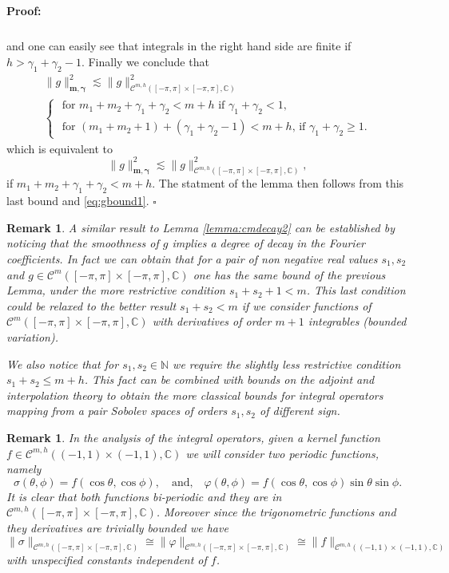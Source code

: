 \documentclass{article}
\newtheorem{remark}[theorem]{Remark}
\newenvironment{proof}{\paragraph{Proof:}}{\hfill$\square$}
\newcommand{\IC}{{\mathbb C}}
\newcommand{\IN}{{\mathbb N}}
\newcommand{\cmspace}[3]{\mathcal{C}^{#1} \left( #2, #3 \right)}
\newcommand{\cmspaceh}[4]{\mathcal{C}^{#1,#2} \left( #3, #4 \right)}
\newcommand{\iinterv}{(-1,1)\times(-1,1)}
\begin{document}
\begin{proof}
\begin{align*}
\end{align*}
and one can easily see that integrals in the right hand side are finite if $h > \gamma_1 + \gamma_2 -1$. 
Finally we conclude that 
\begin{align*}
\|g\|_{\mathbf{m},\mathbf{\gamma}}^2 \lesssim \|g\|^2_{\cmspaceh{m}{h}{[-\pi,\pi]\times[-\pi,\pi]}{\IC}}\\\begin{cases}
 \text{  for $m_1+m_2+\gamma_1 + \gamma_2 < m+h$ if $\gamma_1 + \gamma_2 < 1$},\\
 \text{ for $(m_1+m_2+1)+(\gamma_1+\gamma_2 -1)< m+h$, if $\gamma_1 + \gamma_2 \geq 1$}.
\end{cases}
\end{align*}
which is equivalent to 
$$
\|g\|_{\mathbf{m},\mathbf{\gamma}}^2 \lesssim \|g\|^2_{\cmspaceh{m}{h}{[-\pi,\pi]\times[-\pi,\pi]}{\IC}},
$$
if $m_1+m_2+\gamma_1+\gamma_2 < m+h$. 
The statment of the lemma then follows from this last bound and \eqref{eq:gbound1}.
\end{proof}

\begin{remark}
A similar result to Lemma \ref{lemma:cmdecay2} can be established by noticing that the smoothness of $g$ implies a degree of decay in the Fourier coefficients. In fact we can obtain that for a pair of non negative real values $s_1,s_2$ and $g \in \cmspace{m}{[-\pi,\pi]\times[-\pi,\pi]}{\IC}$ one has the same bound of the previous Lemma, under the more restrictive condition $s_1+s_2+1 < m$.
This last condition could be relaxed to the better result $s_1+s_2 < m$ if we consider functions of $\cmspace{m}{[-\pi,\pi]\times[-\pi,\pi]}{\IC}$ with derivatives of order $m+1$ integrables (bounded variation).

We also notice that for $s_1, s_2 \in \IN$ we require the slightly less restrictive condition $s_1+s_2 \leq m+h$. This fact can be combined with bounds on the adjoint and interpolation theory to obtain the more classical bounds for integral operators mapping from a pair Sobolev spaces of orders $s_1,s_2$ of different sign.
\end{remark}

\begin{remark}
\label{rem:sigmaphi}
In the analysis of the integral operators, given a kernel function $f \in \cmspaceh{m}{h}{\iinterv}{\IC}$ we will consider two periodic functions, namely 
$$
\sigma(\theta,\phi ) = f(\cos \theta, \cos \phi), \quad \text{and,} \quad \varphi(\theta,\phi) = f(\cos \theta, \cos \phi)\sin \theta \sin \phi.
$$
It is clear that both functions bi-periodic and they are in $\cmspaceh{m}{h}{[-\pi,\pi]\times[-\pi,\pi]}{\IC}$. Moreover since the trigonometric functions and they derivatives are trivially bounded we have
$$
\| \sigma \|_{\cmspaceh{m}{h}{[-\pi,\pi]\times[-\pi,\pi]}{\IC}} \cong \| \varphi \|_{\cmspaceh{m}{h}{[-\pi,\pi]\times[-\pi,\pi]}{\IC}} \cong \|f\|_{\cmspaceh{m}{h}{\iinterv}{\IC}}
$$ 
with unspecified constants independent of $f$. 
\end{remark}
\end{document}
